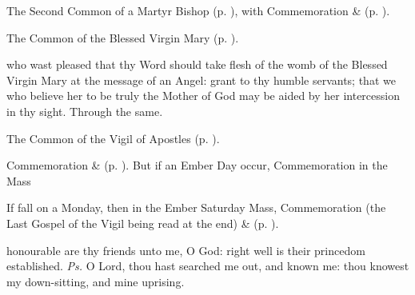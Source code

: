 \begin{rubric}
	The Second Common of a Martyr Bishop (p. \pageref{CommonMartyrBishopII}), with Commemoration  \&  (p. \pageref{SPMaryInAdvent}).
\end{rubric}



\begin{rubric}
	The Common of the Blessed Virgin Mary (p. \pageref{CommonBVM}).
\end{rubric}

\collect
{} who wast pleased that thy Word should take flesh of the womb of the Blessed Virgin Mary at the message of an Angel: grant to thy humble servants; that we who believe her to be truly the Mother of God may be aided by her intercession in thy sight. Through the same.



\begin{rubric}
	The Common of the Vigil of Apostles (p. \pageref{CommonVigilApostles}).
\end{rubric}
\begin{rubric}
	Commemoration  \&  (p. \pageref{SPSaints}). But if an Ember Day occur, Commemoration  in the Mass 
\end{rubric}

\begin{rubric}
	If  fall on a Monday, then in the Ember Saturday Mass, Commemoration  (the Last Gospel of the Vigil being read at the end) \&  (p. \pageref{SPMaryInAdvent}).
\end{rubric}


\clearpage
{}

\introit
{} honourable are thy friends unto me, O God: right well is their princedom established. \textit{Ps.} O Lord, thou hast searched me out, and known me: thou knowest my down-sitting, and mine uprising.

